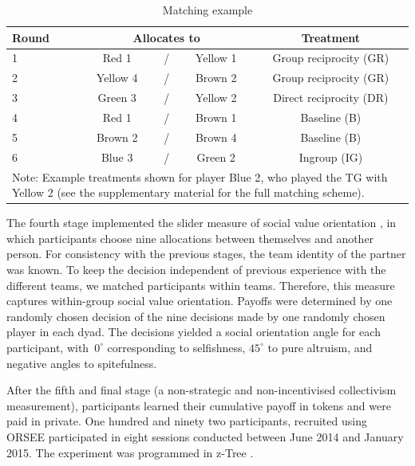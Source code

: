 \documentclass[12pt,a4paper]{article}\usepackage[]{graphicx}\usepackage[]{color}
\begin{document}
\begin{table}
  \caption{Matching example}\label{tab:example}
  \begin{center}
    \begin{tabular}{lcccc}
    \toprule
    Round	&	\multicolumn{3}{c}{Allocates to}		&	Treatment	\\
    \midrule
    1	&	\color{red}Red 1	&	/	&	\color{yellow!80!black}Yellow 1	&	Group reciprocity (GR)	\\
    2	&	\color{yellow!80!black}Yellow 4	&	/	&	\color{brown}Brown 2	&	Group reciprocity (GR)	\\
    3	&	\color{green!60!black}Green 3	&	/	&	\color{yellow!80!black}Yellow 2	&	Direct reciprocity (DR)	\\
    4	&	\color{red}Red 1	&	/	&	\color{brown}Brown 1	&	Baseline (B)	\\
    5	&	\color{brown}Brown 2	&	/	&	\color{brown}Brown 4	&	Baseline (B)	\\
    6	&	\color{blue}Blue 3	&	/	&	\color{green!60!black}Green 2	&	Ingroup (IG)	\\
    \bottomrule
    \multicolumn{5}{p{0.7\textwidth}}{\footnotesize
	Note: Example treatments shown for player {\color{blue}Blue 2}, who played the TG with {\color{yellow!80!black}Yellow 2} (see the supplementary material for the full matching scheme).    
    }
    \end{tabular}
  \end{center}
\end{table}

The fourth stage implemented the slider measure of social value orientation
\citep*{murphy2011measuring,crosetto2012flexible}, in which participants
choose nine allocations between themselves and another person. For
consistency with the previous stages, the team identity of the partner
was known. To keep the decision independent of previous experience
with the different teams, we matched participants within teams. Therefore, this measure captures within-group social value orientation. Payoffs
were determined by one randomly chosen decision of the nine decisions
made by one randomly chosen player in each dyad. The decisions yielded
a social orientation angle for each participant, with~$0^{\circ}$
corresponding to selfishness, $45^{\circ}$ to pure altruism, and
negative angles to spitefulness.

After the fifth and final stage (a non-strategic and non-incentivised
collectivism measurement), participants learned their cumulative payoff in tokens and were paid in private.
One hundred and ninety two participants, recruited using ORSEE \citep*{greiner2015subject} participated in eight sessions conducted between June 2014 and January
2015. %
The experiment was programmed in z-Tree
\citep*{Fischbacher2007}. 
\end{document}
